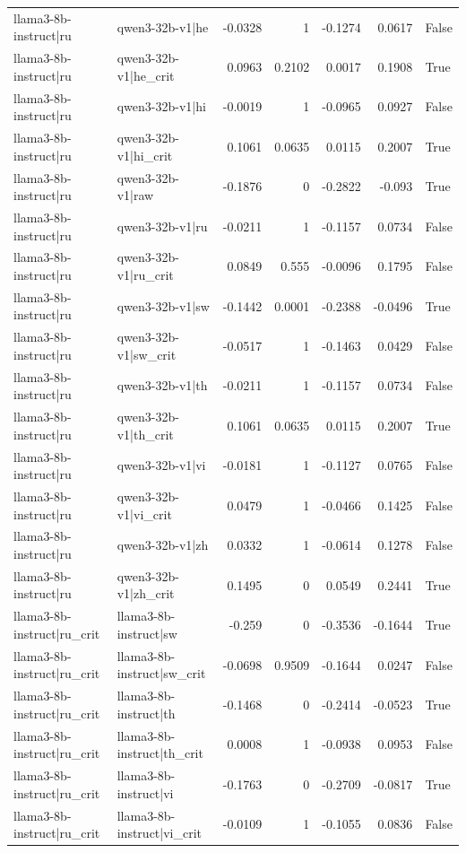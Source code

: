 \begin{table}
\begin{tabular}{l l r r r r l}
llama3-8b-instruct|ru & qwen3-32b-v1|he & -0.0328 & 1 & -0.1274 & 0.0617 & False \\
llama3-8b-instruct|ru & qwen3-32b-v1|he_crit & 0.0963 & 0.2102 & 0.0017 & 0.1908 & True \\
llama3-8b-instruct|ru & qwen3-32b-v1|hi & -0.0019 & 1 & -0.0965 & 0.0927 & False \\
llama3-8b-instruct|ru & qwen3-32b-v1|hi_crit & 0.1061 & 0.0635 & 0.0115 & 0.2007 & True \\
llama3-8b-instruct|ru & qwen3-32b-v1|raw & -0.1876 & 0 & -0.2822 & -0.093 & True \\
llama3-8b-instruct|ru & qwen3-32b-v1|ru & -0.0211 & 1 & -0.1157 & 0.0734 & False \\
llama3-8b-instruct|ru & qwen3-32b-v1|ru_crit & 0.0849 & 0.555 & -0.0096 & 0.1795 & False \\
llama3-8b-instruct|ru & qwen3-32b-v1|sw & -0.1442 & 0.0001 & -0.2388 & -0.0496 & True \\
llama3-8b-instruct|ru & qwen3-32b-v1|sw_crit & -0.0517 & 1 & -0.1463 & 0.0429 & False \\
llama3-8b-instruct|ru & qwen3-32b-v1|th & -0.0211 & 1 & -0.1157 & 0.0734 & False \\
llama3-8b-instruct|ru & qwen3-32b-v1|th_crit & 0.1061 & 0.0635 & 0.0115 & 0.2007 & True \\
llama3-8b-instruct|ru & qwen3-32b-v1|vi & -0.0181 & 1 & -0.1127 & 0.0765 & False \\
llama3-8b-instruct|ru & qwen3-32b-v1|vi_crit & 0.0479 & 1 & -0.0466 & 0.1425 & False \\
llama3-8b-instruct|ru & qwen3-32b-v1|zh & 0.0332 & 1 & -0.0614 & 0.1278 & False \\
llama3-8b-instruct|ru & qwen3-32b-v1|zh_crit & 0.1495 & 0 & 0.0549 & 0.2441 & True \\
llama3-8b-instruct|ru_crit & llama3-8b-instruct|sw & -0.259 & 0 & -0.3536 & -0.1644 & True \\
llama3-8b-instruct|ru_crit & llama3-8b-instruct|sw_crit & -0.0698 & 0.9509 & -0.1644 & 0.0247 & False \\
llama3-8b-instruct|ru_crit & llama3-8b-instruct|th & -0.1468 & 0 & -0.2414 & -0.0523 & True \\
llama3-8b-instruct|ru_crit & llama3-8b-instruct|th_crit & 0.0008 & 1 & -0.0938 & 0.0953 & False \\
llama3-8b-instruct|ru_crit & llama3-8b-instruct|vi & -0.1763 & 0 & -0.2709 & -0.0817 & True \\
llama3-8b-instruct|ru_crit & llama3-8b-instruct|vi_crit & -0.0109 & 1 & -0.1055 & 0.0836 & False \\

\end{tabular}
\end{table}
